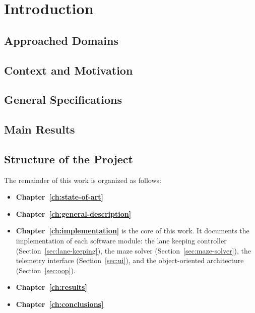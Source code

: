 \chapter{Introduction}
\label{ch:introduction}

\section{Approached Domains}
\label{sec:approached-domains}

\section{Context and Motivation}
\label{sec:context}

\section{General Specifications}
\label{sec:specifications}

\section{Main Results}
\label{sec:main-results}

\section{Structure of the Project}
\label{sec:structure}

The remainder of this work is organized as follows:

\begin{itemize}
    \item \textbf{Chapter~\ref{ch:state-of-art}}
    \item \textbf{Chapter~\ref{ch:general-description}}
    \item \textbf{Chapter~\ref{ch:implementation}} is the core of this work. It documents the implementation of each software module: the lane keeping controller (Section~\ref{sec:lane-keeping}), the maze solver (Section~\ref{sec:maze-solver}), the telemetry interface (Section~\ref{sec:ui}), and the object-oriented architecture (Section~\ref{sec:oop}).
    \item \textbf{Chapter~\ref{ch:results}} 
    \item \textbf{Chapter~\ref{ch:conclusions}} 
\end{itemize}

